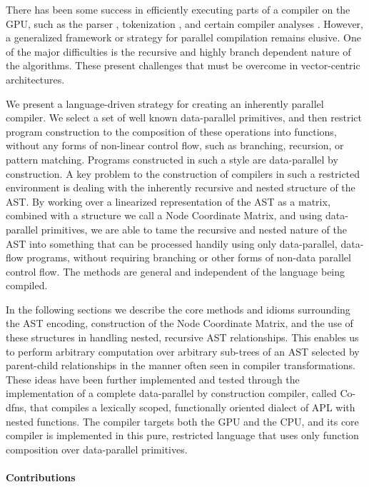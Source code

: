 \documentclass[numbers,preprint]{sigplanconf}
\begin{document}
There has been some success in efficiently executing parts of a compiler 
on the GPU, such as the parser \cite{bunda1984apl}, 
tokenization \cite{bernecky2003tokenizer}, and certain compiler 
analyses \cite{prabhu2011eigencfa,mendez2012inclusion}. However, a generalized 
framework or strategy for parallel compilation remains elusive. One of 
the major difficulties is the recursive and highly branch dependent nature 
of the algorithms. These present challenges that must be overcome in 
vector-centric architectures. 

We present a language-driven strategy for creating an inherently parallel 
compiler. We select a set of well known data-parallel primitives, and then 
restrict program construction to the composition of these operations into 
functions, without any forms of non-linear control flow, such as branching, 
recursion, or pattern matching. Programs constructed in such a style are 
data-parallel by construction. A key problem to the construction of compilers 
in such a restricted environment is dealing with the inherently recursive and 
nested structure of the AST. By working over a linearized representation of 
the AST as a matrix, combined with a structure we call a Node Coordinate 
Matrix, and using data-parallel primitives, we are able to tame the recursive 
and nested nature of the AST into something that can be processed handily 
using only data-parallel, data-flow programs, without requiring branching 
or other forms of non-data parallel control flow. 
The methods are general and independent of the language being compiled.

In the following sections we describe the core methods and idioms surrounding 
the AST encoding, construction of the Node Coordinate Matrix, and the use 
of these structures in handling nested, recursive AST relationships. This 
enables us to perform arbitrary computation over arbitrary sub-trees of an 
AST selected by parent-child relationships in the manner often seen in 
compiler transformations. These ideas have been further implemented and tested 
through the implementation of a complete data-parallel by construction 
compiler, called Co-dfns, that compiles a lexically scoped, functionally 
oriented dialect of APL with nested functions. 
\cite{hsu2014co,hsu2015accelerating}
The compiler targets both the
GPU and the CPU, and its core compiler is implemented in this pure, restricted 
language that uses only function composition over data-parallel primitives. 

\paragraph{Contributions}
\end{document}
